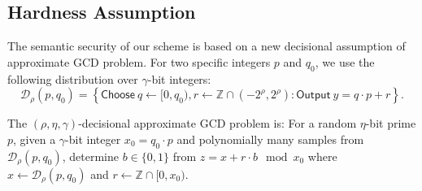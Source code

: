 \documentclass[11pt]{llncs}
\newcommand{\Z}{{\mathbb Z}}
\newcommand*\Choose{\ensuremath{\mathsf{Choose}\ }}
\newcommand*\Output{\ensuremath{\mathsf{Output}\ }}
\newcommand*\D{\ensuremath{\mathcal D}}
\begin{document}
\subsection{Hardness Assumption}\label{decisional_assumption}
The semantic security of our scheme is based on a new decisional assumption of approximate GCD problem. 
 For two specific
integers $p$ and $q_0$, we use the following distribution over
$\gamma$-bit integers:  
\[ \D_\rho(p,q_0) = \left\{ \Choose q\gets [0, q_0),
  r\gets \Z\cap (-2^\rho, 2^\rho) : \Output y=q\cdot p+r
  \right\}. \] 

\begin{definition}
\label{def:dagcd}
The $(\rho,\eta,\gamma)$-decisional approximate GCD problem is: For a random $\eta$-bit prime $p$, given a $\gamma$-bit integer  $x_0=q_0\cdot p$ and polynomially many samples from $\D_{\rho}(p,q_0)$,
determine $b\in\{0,1\}$ from $z=x+r\cdot b\mod x_0$ where $x\gets\D_{\rho}(p,q_0)$ and $r\gets\Z\cap[0,x_0)$.
\end{definition}
\end{document}
